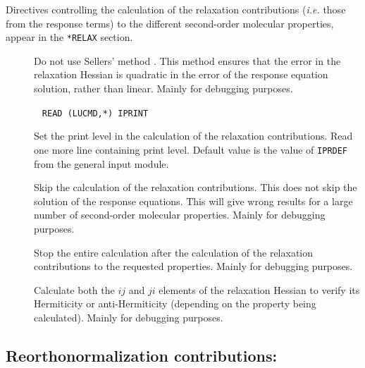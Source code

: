 Directives controlling the calculation of the relaxation
contributions ({\it i.e.\/} those from the response terms) to the different
second-order molecular properties, appear in the \verb|*RELAX| section.
\begin{description}
\item[] Do not use Sellers' method \cite{hsijqc30}. This method
ensures that the error in the relaxation Hessian is quadratic in the
error of the response equation solution, rather than linear. Mainly
for debugging purposes.

\item[]\verb| |\newline
\verb|READ (LUCMD,*) IPRINT|

Set the print level in the calculation of the relaxation
contributions.  Read one more line containing print level.
Default value is the value of \verb|IPRDEF| from the general input
module.

\item[] Skip the calculation of the relaxation
contributions.  This does not skip the solution of the response
equations. This will give wrong results for a large number of
second-order molecular properties. Mainly for debugging purposes.

\item[] Stop the entire calculation after the
calculation of the relaxation contributions to the requested
properties. Mainly for debugging purposes.

\item[] Calculate both the $ij$ and $ji$ elements of
the relaxation Hessian to verify its Hermiticity or anti-Hermiticity
(depending on the property being calculated). Mainly for debugging
purposes.  
\end{description}

\subsection{Reorthonormalization contributions: }

